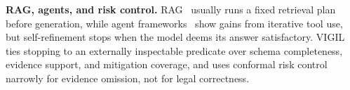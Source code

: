 \textbf{RAG, agents, and risk control.} RAG~\citep{lewis2020retrieval,karpukhin2020dense,gao2023retrieval} usually runs a fixed retrieval plan before generation, while agent frameworks~\citep{yao2022react,shinn2023reflexion,wei2022chain,langgraph2024,autogpt2023,park2023generative,wang2024voyager,wang2024multiagent} show gains from iterative tool use, but self-refinement stops when the model deems its answer satisfactory. VIGIL ties stopping to an externally inspectable predicate over schema completeness, evidence support, and mitigation coverage, and uses conformal risk control~\citep{angelopoulos2023conformalrisk,angelopoulos2021ltt,geifman2017selective} narrowly for evidence omission, not for legal correctness.
